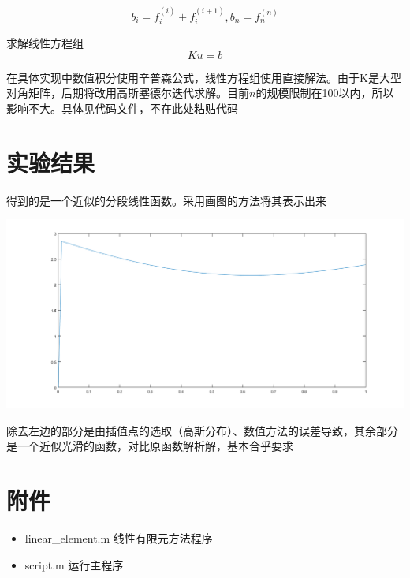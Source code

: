 \documentclass[11pt, a4paper]{article}
\begin{document}
\begin{equation}
b_i=f_i^{(i)}+f_i^{(i+1)},b_n=f_n^{(n)}
\end{equation}

求解线性方程组
\begin{equation}
Ku=b
\end{equation}

在具体实现中数值积分使用辛普森公式，线性方程组使用直接解法。由于K是大型对角矩阵，后期将改用高斯塞德尔迭代求解。目前$n$的规模限制在100以内，所以影响不大。具体见代码文件，不在此处粘贴代码

\section{实验结果}

得到的是一个近似的分段线性函数。采用画图的方法将其表示出来

\includegraphics[width=400pt]{result.png}

除去左边的部分是由插值点的选取（高斯分布）、数值方法的误差导致，其余部分是一个近似光滑的函数，对比原函数解析解，基本合乎要求

\section{附件}
\begin{itemize}
	\item linear\_element.m 线性有限元方法程序
	\item script.m 运行主程序
\end{itemize}
\end{document}
